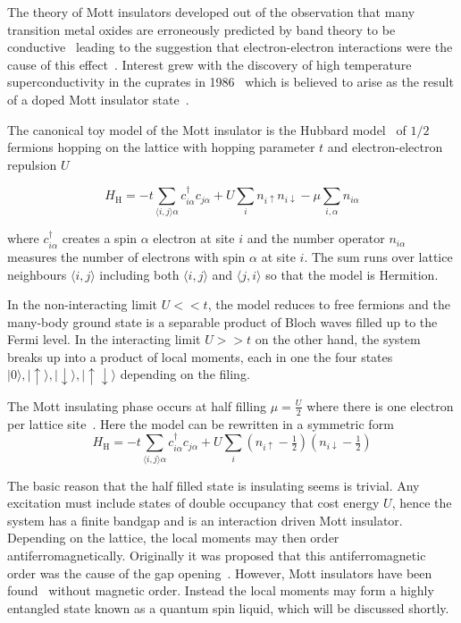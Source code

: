 The theory of Mott insulators developed out of the observation that many transition metal oxides are erroneously predicted by band theory to be conductive~\autocite{boerSemiconductorsPartiallyCompletely1937} leading to the suggestion that electron-electron interactions were the cause of this effect~\autocite{mottDiscussionPaperBoer1937}. Interest grew with the discovery of high temperature superconductivity in the cuprates in 1986~\autocite{bednorzPossibleHighTcSuperconductivity1986} which is believed to arise as the result of a doped Mott insulator state~\autocite{leeDopingMottInsulator2006}.

The canonical toy model of the Mott insulator is the Hubbard model~\autocite{gutzwillerEffectCorrelationFerromagnetism1963,kanamoriElectronCorrelationFerromagnetism1963,hubbardj.ElectronCorrelationsNarrow1963} of \(1/2\) fermions hopping on the lattice with hopping parameter \(t\) and electron-electron repulsion \(U\)

\[ H_{\mathrm{H}} = -t \sum_{\langle i,j \rangle \alpha} c^\dagger_{i\alpha} c_{j\alpha} + U \sum_i n_{i\uparrow} n_{i\downarrow} - \mu \sum_{i,\alpha} n_{i\alpha}\]

where \(c^\dagger_{i\alpha}\) creates a spin \(\alpha\) electron at site \(i\) and the number operator \(n_{i\alpha}\) measures the number of electrons with spin \(\alpha\) at site \(i\). The sum runs over lattice neighbours \(\langle i,j \rangle\) including both \(\langle i,j \rangle\) and \(\langle j,i \rangle\) so that the model is Hermition.

In the non-interacting limit \(U << t\), the model reduces to free fermions and the many-body ground state is a separable product of Bloch waves filled up to the Fermi level. In the interacting limit \(U >> t\) on the other hand, the system breaks up into a product of local moments, each in one the four states \(|0\rangle, |\uparrow\rangle, |\downarrow\rangle, |\uparrow\downarrow\rangle\) depending on the filing.

The Mott insulating phase occurs at half filling \(\mu = \tfrac{U}{2}\) where there is one electron per lattice site~\autocite{hubbardElectronCorrelationsNarrow1964}. Here the model can be rewritten in a symmetric form \[ H_{\mathrm{H}} = -t \sum_{\langle i,j \rangle \alpha} c^\dagger_{i\alpha} c_{j\alpha} + U \sum_i (n_{i\uparrow} - \tfrac{1}{2})(n_{i\downarrow} - \tfrac{1}{2})\]

The basic reason that the half filled state is insulating seems is trivial. Any excitation must include states of double occupancy that cost energy \(U\), hence the system has a finite bandgap and is an interaction driven Mott insulator. Depending on the lattice, the local moments may then order antiferromagnetically. Originally it was proposed that this antiferromagnetic order was the cause of the gap opening~\autocite{mottMetalInsulatorTransitions1990}. However, Mott insulators have been found~\autocite{law1TTaS2QuantumSpin2017,ribakGaplessExcitationsGround2017} without magnetic order. Instead the local moments may form a highly entangled state known as a quantum spin liquid, which will be discussed shortly.

